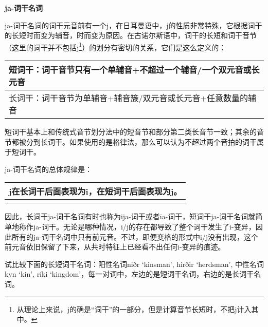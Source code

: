 \textbf{ja-词干名词}

ja-词干名词的词干元音前有一个j，在日耳曼语中，j的性质非常特殊，它根据词干的长短时而变为辅音，时而变为原因。在古诺尔斯语中，词干的长短和词干音节（这里的词干并不包括j\footnote{从理论上来说，j的确是``词干''的一部分，但是计算音节长短时，不把j计入其中。}）的划分有密切的关系，它们是这么定义的：

\begin{longtable}{l}
  \toprule
  短词干：词干音节只有一个单辅音+不超过一个辅音/一个双元音或长元音 \\
  \midrule
  \endhead
  \bottomrule
  \endfoot
  长词干：词干音节为单辅音+辅音簇/双元音或长元音+任意数量的辅音    \\
\end{longtable}

短词干基本上和传统式音节划分法中的短音节和部分第二类长音节一致；其余的音节都被分到长词干。如果使用的是格律法，那么可以认为不超过两个音拍的词干属于短词干。

ja-词干名词的总体规律是：

\begin{longtable}{l}
  \toprule
  j在长词干后面表现为i，在短词干后面表现为j。 \\
  \midrule
  \endhead
  \bottomrule
  \endfoot
\end{longtable}

因此，长词干ja-词干名词有时也称为ija-词干或者īa-词干，短词干ja-词干名词就简单地称作ja-词干。无论是哪种情况，i/j的存在都导致了整个词干发生了i-变异，因此所有的ja-词干名词中只有前元音。不过，即便变格的形式中i/j没有出现，这个前元音依旧保留了下来，从共时特征上已经看不出任何i-变异的痕迹。

试比较下面的长短词干名词：阳性名词niðr `kinsman', hirðir `herdsman',
中性名词kyn `kin', ríki
`kingdom'，每一对词中，左边的是短词干名词，右边的是长词干名词。

